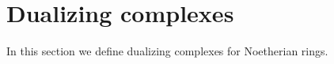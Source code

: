 \section{Dualizing complexes}
\label{section-dualizing}

\noindent
In this section we define dualizing complexes for Noetherian rings.

